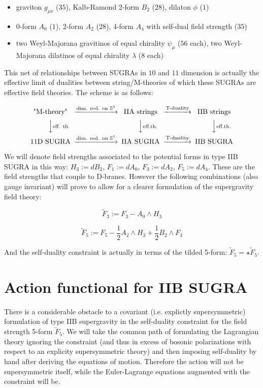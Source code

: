 \documentclass[11pt,a4paper,twoside,openright]{book}
\begin{document}
\begin{itemize}
\item graviton $g_{\mu\nu}$ ($35$), Kalb-Ramond 2-form $B_2$ ($28$), dilaton $\phi$ ($1$)
\item 0-form $A_0$ ($1$), 2-form $A_2$ ($28$), 4-form $A_4$ with self-dual field strength ($35$)
\item two Weyl-Majorana gravitinos of equal chirality $\psi_\mu$ ($56$ each), two Weyl-Majorana dilatinos of equal chirality $\lambda$ ($8$ each)
\end{itemize}

This net of relationships between SUGRAs in $10$ and $11$ dimension is actually the effective limit of dualities between string/M-theories of which these SUGRAs are effective field theories. The scheme is as follows:

\[\begin{CD}
\text{"M-theory"}     @> \text{dim. red. on }\mathbb{S}^1>>  \text{IIA strings} @> \text{T-duality} >> \text{IIB strings} \\
@VV\text{eff. th.}V        @VV\text{eff.th.}V  @VV \text{eff.th.} V\\
\text{11D SUGRA}     @> \text{dim. red. on }\mathbb{S}^1>> \text{IIA SUGRA} @> \text{T-duality}>>  \text{IIB SUGRA}
\end{CD}\]

We will denote field strengths associated to the potential forms in type IIB SUGRA in this way: $H_3 := dB_2$, $F_1 := dA_0$, $F_3 := dA_2$, $F_5 := dA_4$. These are the field strengths that couple to D-branes. However the following combinations (also gauge invariant) will prove to allow for a clearer formulation of the supergravity field theory:

\[ \tilde{F}_3 := F_3 - A_0 \wedge H_3 \]

\[ \tilde{F}_5 := F_5 - \frac{1}{2} A_2 \wedge H_3 + \frac{1}{2} B_2 \wedge F_3 \]

And the self-duality constraint is actually in terms of the tilded 5-form: $\tilde{F}_5 = \star \tilde{F}_5$.

\section{Action functional for IIB SUGRA}

There is a considerable obstacle to a covariant (i.e. explictly supersymmetric) formulation of type IIB supergravity in the self-duality constraint for the field strength 5-form $\tilde{F}_5$. We will take the common path of formulating the Lagrangian theory ignoring the constraint (and thus in excess of bosonic polarizations with respect to an explicity supersymmetric theory) and then imposing self-duality by hand after deriving the equations of motion. Therefore the action will not be supersymmetric itself, while the Euler-Lagrange equations augmented with the constraint will be.\\
\end{document}
